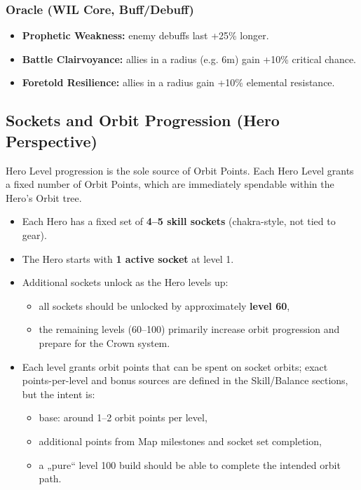 \subsubsection*{Oracle (WIL Core, Buff/Debuff)}

\begin{itemize}
	\item \textbf{Prophetic Weakness:} enemy debuffs last +25\% longer.
	\item \textbf{Battle Clairvoyance:} allies in a radius (e.g. 6m) gain +10\% critical chance.
	\item \textbf{Foretold Resilience:} allies in a radius gain +10\% elemental resistance.
\end{itemize}


\subsection{Sockets and Orbit Progression (Hero Perspective)}

Hero Level progression is the sole source of Orbit Points.
Each Hero Level grants a fixed number of Orbit Points, which are immediately spendable within the Hero’s Orbit tree.

\begin{itemize}
	\item Each Hero has a fixed set of \textbf{4--5 skill sockets} (chakra-style, not tied to gear).
	\item The Hero starts with \textbf{1 active socket} at level 1.
	\item Additional sockets unlock as the Hero levels up:
	\begin{itemize}
		\item all sockets should be unlocked by approximately \textbf{level 60},
		\item the remaining levels (60--100) primarily increase orbit progression and prepare for the Crown system.
	\end{itemize}
	\item Each level grants orbit points that can be spent on socket orbits; exact points-per-level and bonus sources are defined in the Skill/Balance sections, but the intent is:
	\begin{itemize}
		\item base: around 1--2 orbit points per level,
		\item additional points from Map milestones and socket set completion,
		\item a „pure“ level 100 build should be able to complete the intended orbit path.
	\end{itemize}
\end{itemize}

